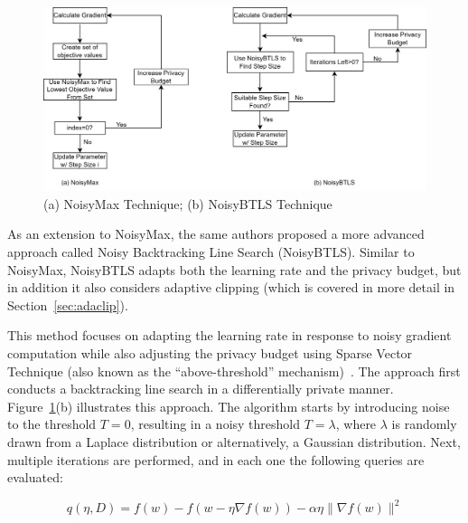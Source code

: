 \begin{figure}[h]
\centering
    \includegraphics[width=1\linewidth]{submissions/submission5/figs/NoisyMax vs NoisyBTLS2.png}
   \caption{(a) NoisyMax Technique; (b) NoisyBTLS Technique}
   \label{fig:noisymax}
\end{figure} 

As an extension to NoisyMax, the same authors proposed a more advanced approach called Noisy Backtracking Line Search (NoisyBTLS). Similar to NoisyMax, NoisyBTLS adapts both the learning rate and the privacy budget, but in addition it also considers adaptive clipping (which is covered in more detail in Section~\ref{sec:adaclip}).

This method focuses on adapting the learning rate in response to noisy gradient computation while also adjusting the privacy budget using Sparse Vector Technique (also known as the ``above-threshold'' mechanism)~\cite{RefWorks:RefID:61-roth2011interactive,RefWorks:RefID:62-hardtmultiplicative}.
The approach first conducts a backtracking line search in a differentially private manner. %
Figure~\ref{fig:noisymax}(b) illustrates this approach. The algorithm starts by introducing noise to the threshold \( T=0 \), resulting in a noisy threshold \( T=\lambda \), where \( \lambda \) is randomly drawn from a Laplace distribution or alternatively, a Gaussian distribution. Next, multiple iterations are performed, and in each one the following queries are evaluated:

\[ q(\eta,D)=f(w)-f(w-\eta\nabla f(w))-\alpha\eta\|\nabla f(w)\|^2 \]

